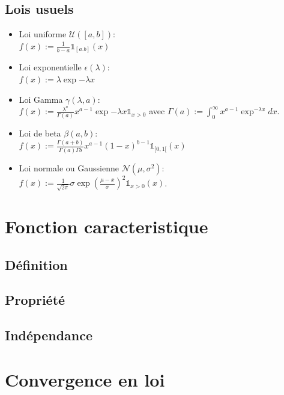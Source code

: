 \documentclass[a4paper, 12pt, french]{report}
\theoremstyle{break}
\begin{document}
\section{Lois usuels}
\begin{itemize}
	\item Loi uniforme $\mathcal{U}([a,b])$: \\ $f(x) := \frac{1}{b-a} \mathds{1}_{[a.b]}(x)$
	\item Loi exponentielle $\epsilon(\lambda)$: \\ $f(x) := \lambda \exp{-\lambda x}$
	\item Loi Gamma $\gamma(\lambda, a)$: \\ $f(x) := \frac{\lambda^{a}}{\Gamma (a)} x^{a-1} \exp{-\lambda x} \mathds{1}_{x>0}$ avec $\Gamma (a) := \int_{0}^{\infty} x^{a-1}\exp^{-\lambda x} dx$.
	\item Loi de beta $\beta (a,b)$: \\ $f(x):= \frac{\Gamma (a+b)}{\Gamma(a) \Gamma{b}} x^{a-1} (1-x)^{b-1}\mathds{1}_{]0,1[}(x)$
	\item Loi normale ou Gaussienne $\mathcal{N}(\mu, \sigma^{2})$: \\ $f(x):= \frac{1}{\sqrt{2\pi}}\sigma \exp{(\frac{\mu - x}{\sigma})^{2}} \mathds{1}_{x>0}(x)$.
\end{itemize}

\chapter{Fonction caracteristique}

\section{Définition}

\section{Propriété}

\section{Indépendance}

\chapter{Convergence en loi}
\end{document}
